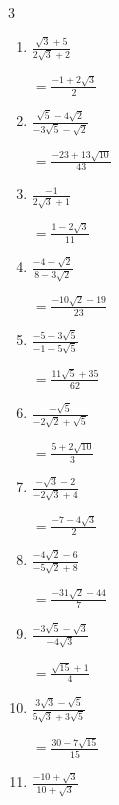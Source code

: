 \begin{multicols}{3}
\begin{enumerate}
        $\displaystyle =\frac{5-10\sqrt{2}}{7}$

  \item $\displaystyle \frac{\sqrt{3}+5}{2\sqrt{3}+2}$

        $\displaystyle =\frac{-1+2\sqrt{3}}{2}$

\columnbreak %

\resetques

  \item $\displaystyle \frac{\sqrt{5}-4\sqrt{2}}{-3\sqrt{5}-\sqrt{2}}$

        $\displaystyle =\frac{-23+13\sqrt{10}}{43}$

  \item $\displaystyle \frac{-1}{2\sqrt{3}+1}$

        $\displaystyle =\frac{1-2\sqrt{3}}{11}$

  \item $\displaystyle \frac{-4-\sqrt{2}}{8-3\sqrt{2}}$

        $\displaystyle =\frac{-10\sqrt{2}-19}{23}$

  \item $\displaystyle \frac{-5-3\sqrt{5}}{-1-5\sqrt{5}}$

        $\displaystyle =\frac{11\sqrt{5}+35}{62}$

  \item $\displaystyle \frac{-\sqrt{5}}{-2\sqrt{2}+\sqrt{5}}$

        $\displaystyle =\frac{5+2\sqrt{10}}{3}$

\columnbreak %

  \item $\displaystyle \frac{-\sqrt{3}-2}{-2\sqrt{3}+4}$

        $\displaystyle =\frac{-7-4\sqrt{3}}{2}$

  \item $\displaystyle \frac{-4\sqrt{2}-6}{-5\sqrt{2}+8}$

        $\displaystyle =\frac{-31\sqrt{2}-44}{7}$

  \item $\displaystyle \frac{-3\sqrt{5}-\sqrt{3}}{-4\sqrt{3}}$

        $\displaystyle =\frac{\sqrt{15}+1}{4}$

  \item $\displaystyle \frac{3\sqrt{3}-\sqrt{5}}{5\sqrt{3}+3\sqrt{5}}$

        $\displaystyle =\frac{30-7\sqrt{15}}{15}$

  \item $\displaystyle \frac{-10+\sqrt{3}}{10+\sqrt{3}}$


\end{enumerate}
\end{multicols}
